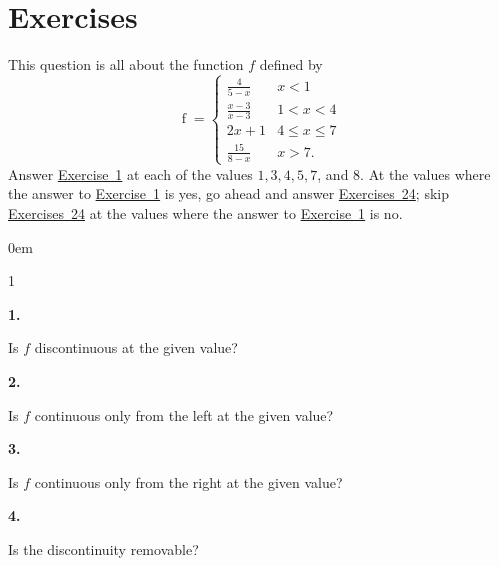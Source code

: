 \documentclass[12pt,]{book}
\newcommand{\lt}{<}
\newcommand{\gt}{>}
\theoremstyle{plain}
\theoremstyle{definition}
\numberwithin{equation}{section}
\newenvironment{exercisegroup}%
{\medskip\noindent}%
{\par\bigskip}%
\newlength{\exercisegroupindent}%
\newlength{\exercisegroupitemwidth}%
\newenvironment{exercisegrouplist}%
{\vspace{-\partopsep}%
\begin{adjustwidth}{\exercisegroupindent}{0em}}%
{\end{adjustwidth}%
\vspace{-\partopsep}%
\vspace{\baselineskip}}%
\newenvironment{exercisegroupbycol}[1]%
{\begin{exercisegrouplist}%
\vspace{-\multicolsep}%
\begin{multicols}{#1}%
\setlength{\parindent}{0em}%
\setlength{\exercisegroupitemwidth}{\linewidth}}%
{\end{multicols}%
\vspace{-\multicolsep}%
\end{exercisegrouplist}}%
\newenvironment{exercisegroupitem}[1]%
{\begin{minipage}[t]{\exercisegroupitemwidth}
\vspace{0pt}%
{\bfseries#1}%
\rule{0pt}{\baselineskip}}{\strut%
\end{minipage}%
\hspace{\columnsep}}%
\providecommand\phantomsection{}
\newcommand{\fe}[2]{\mathop{{#1}{\left(#2\right)}}}
\begin{document}
\section*{Exercises}\label{exercises-16}

\begin{exercisegroup}%
This question is all about the function \(f\) defined by \[\fe{f}{x}=\begin{cases}\frac{4}{5-x}&x\lt1\\\frac{x-3}{x-3}&1\lt x\lt4\\2x+1&4\leq x\leq7\\\frac{15}{8-x}&x\gt7\text{.}\end{cases}\] Answer \hyperref[exercise-first-piecewise]{Exercise~1} at each of the values \(1,3,4,5,7\), and \(8\). At the values where the answer to \hyperref[exercise-first-piecewise]{Exercise~1} is yes, go ahead and answer \hyperref[exercise-second-piecewise]{Exercises~2}\textendash{}\hyperref[exercise-last-piecewise]{4}; skip \hyperref[exercise-second-piecewise]{Exercises~2}\textendash{}\hyperref[exercise-last-piecewise]{4} at the values where the answer to \hyperref[exercise-first-piecewise]{Exercise~1} is no.%
\begin{exercisegroupbycol}{1}%
\begin{exercisegroupitem}{1. }\phantomsection\hypertarget{exercise-first-piecewise}{\null}
Is \(f\) discontinuous at the given value?%
\end{exercisegroupitem}%
\par%
\begin{exercisegroupitem}{2. }\phantomsection\hypertarget{exercise-second-piecewise}{\null}
Is \(f\) continuous only from the left at the given value?%
\end{exercisegroupitem}%
\par%
\begin{exercisegroupitem}{3. }\phantomsection\hypertarget{exercise-114}{\null}
Is \(f\) continuous only from the right at the given value?%
\end{exercisegroupitem}%
\par%
\begin{exercisegroupitem}{4. }\phantomsection\hypertarget{exercise-last-piecewise}{\null}
Is the discontinuity removable?%
\end{exercisegroupitem}%
\par%
\end{exercisegroupbycol}%
\end{exercisegroup}%
\end{document}
